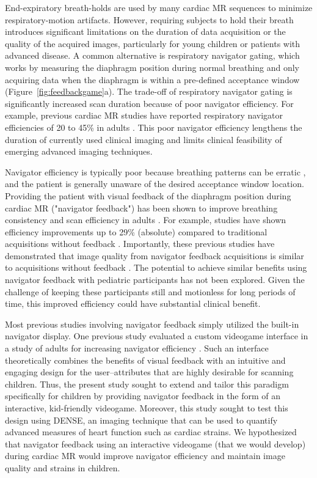 	End-expiratory breath-holds are used by many cardiac MR sequences to minimize respiratory-motion artifacts. However, requiring subjects to hold their breath introduces significant limitations on the duration of data acquisition or the quality of the acquired images, particularly for young children or patients with advanced disease. A common alternative is respiratory navigator gating, which works by measuring the diaphragm position during normal breathing and only acquiring data when the diaphragm is within a pre-defined acceptance window (Figure~\ref{fig:feedbackgame}a). The trade-off of respiratory navigator gating is significantly increased scan duration because of poor navigator efficiency. For example, previous cardiac MR studies have reported respiratory navigator efficiencies of 20 to 45\% in adults \cite{Abd-Elmoniem2011,Feuerlein2009,Jhooti2011,Wang1996}. This poor navigator efficiency lengthens the duration of currently used clinical imaging and limits clinical feasibility of emerging advanced imaging techniques.
	
	Navigator efficiency is typically poor because breathing patterns can be erratic \cite{Liu1993,Wang1995a,Taylor1997a}, and the patient is generally unaware of the desired acceptance window location. Providing the patient with visual feedback of the diaphragm position during cardiac MR ("navigator feedback") has been shown to improve breathing consistency and scan efficiency in adults \cite{Feuerlein2009,Liu1993}. For example, studies have shown efficiency improvements up to 29\% (absolute) compared to traditional acquisitions without feedback \cite{Feuerlein2009,Jhooti2011}. Importantly, these previous studies have demonstrated that image quality from navigator feedback acquisitions is similar to acquisitions without feedback \cite{Feuerlein2009,Jhooti2011}. The potential to achieve similar benefits using navigator feedback with pediatric participants has not been explored. Given the challenge of keeping these participants still and motionless for long periods of time, this improved efficiency could have substantial clinical benefit.
	
	Most previous studies involving navigator feedback simply utilized the built-in navigator display. One previous study evaluated a custom videogame interface in a study of adults for increasing navigator efficiency \cite{Jhooti2011}. Such an interface theoretically combines the benefits of visual feedback with an intuitive and engaging design for the user--attributes that are highly desirable for scanning children. Thus, the present study sought to extend and tailor this paradigm specifically for children by providing navigator feedback in the form of an interactive, kid-friendly videogame. Moreover, this study sought to test this design using DENSE, an imaging technique that can be used to quantify advanced measures of heart function such as cardiac strains. We hypothesized that navigator feedback using an interactive videogame (that we would develop) during cardiac MR would improve navigator efficiency and maintain image quality and strains in children.

